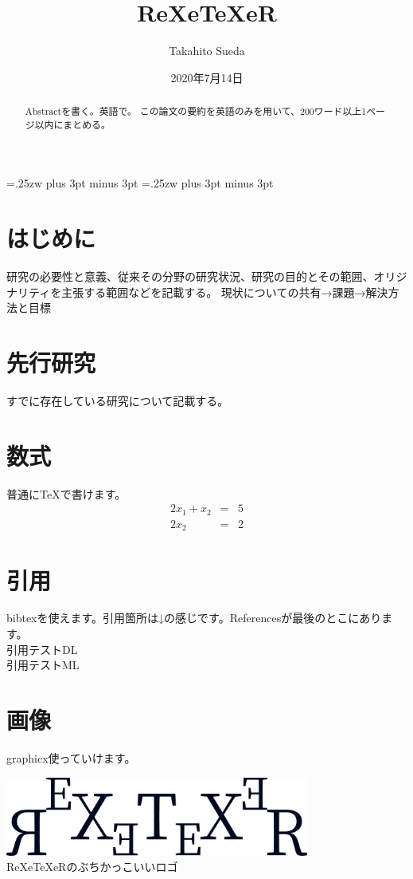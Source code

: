 \documentclass[a4paper,xelatex,ja=standard]{bxjsarticle}
\title{ReXeTeXeR}
\author{Takahito Sueda}
\date{2020年7月14日}
\affiliation{情報システム系} %
\begin{document}
  \maketitle
  \kanjiskip=.25zw plus 3pt minus 3pt %
  \xkanjiskip=.25zw plus 3pt minus 3pt %

  \begin{abstract}
    Abstractを書く。英語で。
    この論文の要約を英語のみを用いて、200ワード以上1ページ以内にまとめる。
  \end{abstract}

  \tableofcontents

  \section{はじめに} %
  \label{sec1}
  研究の必要性と意義、従来その分野の研究状況、研究の目的とその範囲、オリジナリティを主張する範囲などを記載する。
  現状についての共有→課題→解決方法と目標

  \section{先行研究} %
  すでに存在している研究について記載する。

  \section{数式}
  普通に{\TeX}で書けます。
  \begin{eqnarray}
    2x_1 + x_2 & = & 5 \\
    2x_2 & = & 2
  \end{eqnarray}

  \section{引用}
  bibtexを使えます。引用箇所は↓の感じです。Referencesが最後のとこにあります。\\
  引用テストDL\cite{lecun2015deep} \\
  引用テストML\cite{michie1994machine}

  \section{画像}
  graphicx使っていけます。
  \begin{center}
    \includegraphics[width=10cm]{img/logo.png} \\
    ReXeTeXeRのぶちかっこいいロゴ
  \end{center}
\end{document}
